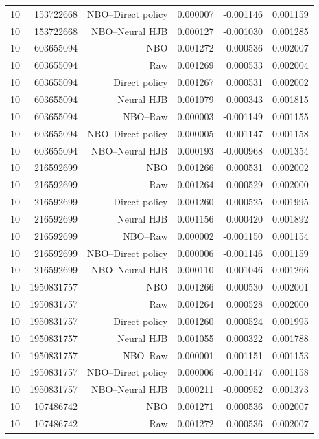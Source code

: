\begin{longtable}{lrrrrr}
10 & 153722668 & NBO--Direct policy & 0.000007 & -0.001146 & 0.001159 \\
10 & 153722668 & NBO--Neural HJB & 0.000127 & -0.001030 & 0.001285 \\
10 & 603655094 & NBO & 0.001272 & 0.000536 & 0.002007 \\
10 & 603655094 & Raw & 0.001269 & 0.000533 & 0.002004 \\
10 & 603655094 & Direct policy & 0.001267 & 0.000531 & 0.002002 \\
10 & 603655094 & Neural HJB & 0.001079 & 0.000343 & 0.001815 \\
10 & 603655094 & NBO--Raw & 0.000003 & -0.001149 & 0.001155 \\
10 & 603655094 & NBO--Direct policy & 0.000005 & -0.001147 & 0.001158 \\
10 & 603655094 & NBO--Neural HJB & 0.000193 & -0.000968 & 0.001354 \\
10 & 216592699 & NBO & 0.001266 & 0.000531 & 0.002002 \\
10 & 216592699 & Raw & 0.001264 & 0.000529 & 0.002000 \\
10 & 216592699 & Direct policy & 0.001260 & 0.000525 & 0.001995 \\
10 & 216592699 & Neural HJB & 0.001156 & 0.000420 & 0.001892 \\
10 & 216592699 & NBO--Raw & 0.000002 & -0.001150 & 0.001154 \\
10 & 216592699 & NBO--Direct policy & 0.000006 & -0.001146 & 0.001159 \\
10 & 216592699 & NBO--Neural HJB & 0.000110 & -0.001046 & 0.001266 \\
10 & 1950831757 & NBO & 0.001266 & 0.000530 & 0.002001 \\
10 & 1950831757 & Raw & 0.001264 & 0.000528 & 0.002000 \\
10 & 1950831757 & Direct policy & 0.001260 & 0.000524 & 0.001995 \\
10 & 1950831757 & Neural HJB & 0.001055 & 0.000322 & 0.001788 \\
10 & 1950831757 & NBO--Raw & 0.000001 & -0.001151 & 0.001153 \\
10 & 1950831757 & NBO--Direct policy & 0.000006 & -0.001147 & 0.001158 \\
10 & 1950831757 & NBO--Neural HJB & 0.000211 & -0.000952 & 0.001373 \\
10 & 107486742 & NBO & 0.001271 & 0.000536 & 0.002007 \\
10 & 107486742 & Raw & 0.001272 & 0.000536 & 0.002007 \\

\end{longtable}
